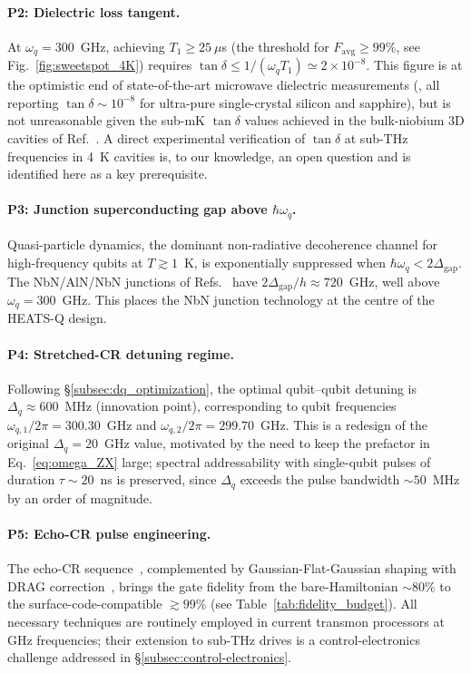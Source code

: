 \paragraph{P2: Dielectric loss tangent.}
At $\omega_q = 300$~GHz, achieving $T_1 \ge 25~\mu$s
(the threshold for $F_{\text{avg}}\ge 99\%$, see Fig.~\ref{fig:sweetspot_4K})
requires
$\tan\delta \le 1/(\omega_q T_1) \simeq 2\!\times\!10^{-8}$.
This figure is at the optimistic end of state-of-the-art
microwave dielectric measurements
(\cite{Krupka1999Sapphire, Wang2015, Read2023Sapphire}, all reporting
$\tan\delta\sim 10^{-8}$ for ultra-pure single-crystal silicon and
sapphire), but is not unreasonable given the sub-mK $\tan\delta$ values
achieved in the bulk-niobium 3D cavities of
Ref.~\cite{Romanenko2020}. A direct experimental verification of $\tan\delta$
at sub-THz frequencies in 4~K cavities is, to our knowledge, an open question
and is identified here as a key prerequisite.

\paragraph{P3: Junction superconducting gap above $\hbar\omega_q$.}
Quasi-particle dynamics, the dominant non-radiative decoherence channel for
high-frequency qubits at $T\!\gtrsim\!1$~K, is exponentially suppressed when
$\hbar\omega_q < 2\Delta_{\text{gap}}$. The NbN/AlN/NbN
junctions of Refs.~\cite{nakamura2011epitaxialNbN, Delahaye2015} have
$2\Delta_{\text{gap}}/h \approx 720$~GHz, well above $\omega_q = 300$~GHz.
This places the NbN junction technology at the centre of the HEATS-Q design.

\paragraph{P4: Stretched-CR detuning regime.}
Following \S\ref{subsec:dq_optimization}, the optimal qubit--qubit detuning
is $\Delta_q \approx 600$~MHz (innovation point), corresponding to qubit
frequencies $\omega_{q,1}/2\pi = 300.30$~GHz and
$\omega_{q,2}/2\pi = 299.70$~GHz. This is a redesign of the original
$\Delta_q = 20$~GHz value, motivated by the need to keep the prefactor in
Eq.~\eqref{eq:omega_ZX} large; spectral addressability with single-qubit
pulses of duration $\tau\!\sim\!20$~ns is preserved, since $\Delta_q$ exceeds
the pulse bandwidth $\sim 50$~MHz by an order of magnitude.

\paragraph{P5: Echo-CR pulse engineering.}
The echo-CR sequence~\cite{Sheldon2016}, complemented by Gaussian-Flat-Gaussian
shaping with DRAG correction~\cite{Motzoi2009, Gambetta2011},
brings the gate fidelity from the bare-Hamiltonian
$\sim 80\%$ to the surface-code-compatible $\gtrsim 99\%$ (see
Table~\ref{tab:fidelity_budget}). All necessary techniques are routinely
employed in current transmon processors at GHz frequencies; their
extension to sub-THz drives is a control-electronics challenge addressed in
\S\ref{subsec:control-electronics}.

